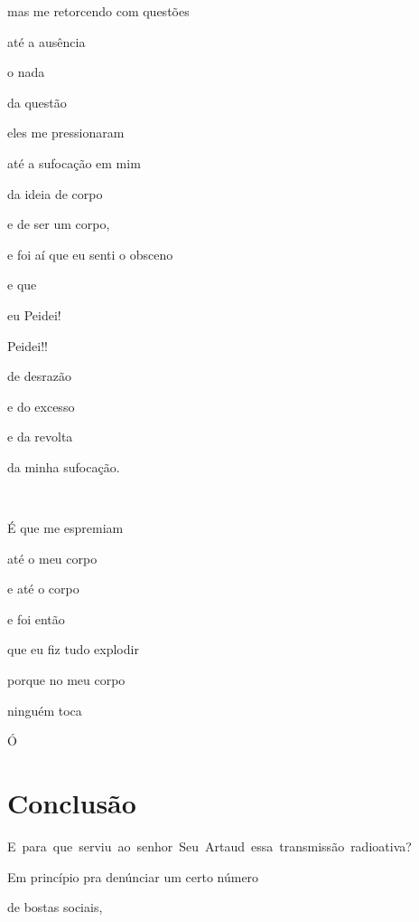 mas me retorcendo com questões

até a ausência

o nada

da questão

eles me pressionaram

até a sufocação em mim

da ideia de corpo

e de ser um corpo,

e foi aí que eu senti o obsceno

e que

eu Peidei!

Peidei!!


de desrazão

e do excesso

e da revolta \EP[1]

da minha sufocação.

~

É que me espremiam

até o meu corpo

e até o corpo

e foi então

que eu fiz tudo explodir


porque no meu corpo

ninguém toca


Ó

\chapter{Conclusão}




\mbox{E para que serviu ao senhor Seu Artaud essa transmissão radioativa?}


Em princípio pra denúnciar um certo número

de bostas sociais,

